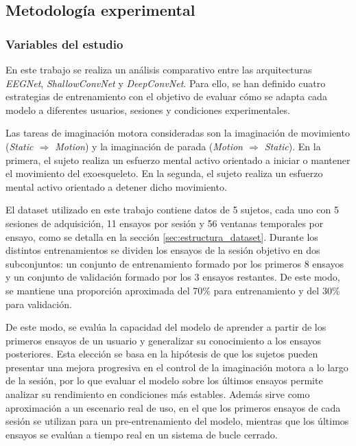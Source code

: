 
\subsection{Metodología experimental}

\subsubsection{Variables del estudio}

En este trabajo se realiza un análisis comparativo entre las arquitecturas \textit{EEGNet}, \textit{ShallowConvNet} y \textit{DeepConvNet}. Para ello, se han definido cuatro estrategias de entrenamiento con el objetivo de evaluar cómo se adapta cada modelo a diferentes usuarios, sesiones y condiciones experimentales.

Las tareas de imaginación motora consideradas son la imaginación de movimiento (\textit{Static \(\Rightarrow\) Motion}) y la imaginación de parada (\textit{Motion \(\Rightarrow\) Static}). En la primera, el sujeto realiza un esfuerzo mental activo orientado a iniciar o mantener el movimiento del exoesqueleto. En la segunda, el sujeto realiza un esfuerzo mental activo orientado a detener dicho movimiento.

El dataset utilizado en este trabajo contiene datos de 5 sujetos, cada uno con 5 sesiones de adquisición, 11 ensayos por sesión y 56 ventanas temporales por ensayo, como se detalla en la sección \ref{sec:estructura_dataset}. Durante los distintos entrenamientos se dividen los ensayos de la sesión objetivo en dos subconjuntos: un conjunto de entrenamiento formado por los primeros 8 ensayos y un conjunto de validación formado por los 3 ensayos restantes. De este modo, se mantiene una proporción aproximada del 70\% para entrenamiento y del 30\% para validación.

De este modo, se evalúa la capacidad del modelo de aprender a partir de los primeros ensayos de un usuario y generalizar su conocimiento a los ensayos posteriores. Esta elección se basa en la hipótesis de que los sujetos pueden presentar una mejora progresiva en el control de la imaginación motora a lo largo de la sesión, por lo que evaluar el modelo sobre los últimos ensayos permite analizar su rendimiento en condiciones más estables. Además sirve como aproximación a un escenario real de uso, en el que los primeros ensayos de cada sesión se utilizan para un pre-entrenamiento del modelo, mientras que los últimos ensayos se evalúan a tiempo real en un sistema de bucle cerrado.

